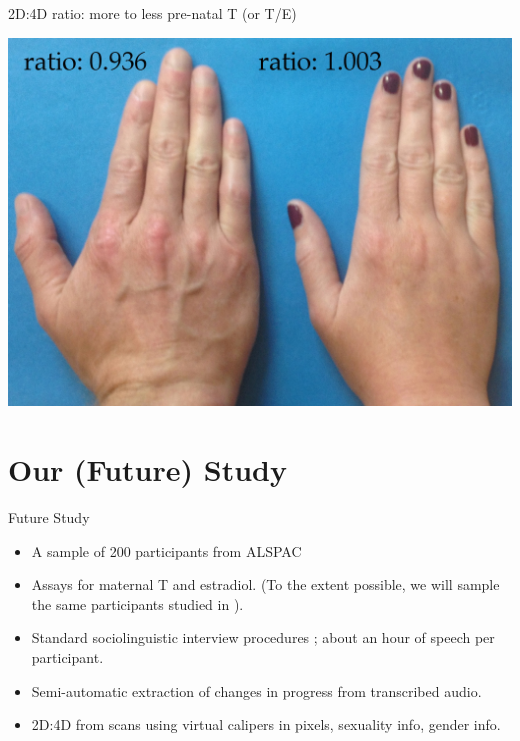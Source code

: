 \documentclass[hyperref={pdfpagelabels=false}]{beamer}
\begin{document}
\begin{frame}{2D:4D ratio: more to less pre-natal T (or T/E)}
\begin{center}
	\includegraphics[width=1.12\textwidth]{figures/realhands2.jpg}
\end{center}
\end{frame}


\section{Our (Future) Study}

\begin{frame}{Future Study}
\begin{itemize}
	\item A sample of 200 participants from ALSPAC
	\item Assays for maternal T and estradiol. (To the extent possible, we will sample the same participants studied in \citealt{hinesetal2002}). 
	\item Standard sociolinguistic interview procedures \citep{tagliamonte2006}; about an hour of speech per participant.
	\item Semi-automatic extraction of changes in progress from transcribed audio.
	\item 2D:4D from scans using virtual calipers in pixels, sexuality info, gender info.
\end{itemize}
\end{frame}
\end{document}
